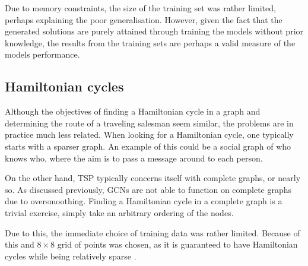 Due to memory constraints, the size of the training set was rather limited, perhaps explaining the poor generalisation.
However, given the fact that the generated solutions are purely attained through training the models without prior knowledge, the results from the training sets are perhaps a valid measure of the models performance.

\subsection{Hamiltonian cycles}
Although the objectives of finding a Hamiltonian cycle in a graph and determining the route of a traveling salesman seem similar, the problems are in practice much less related.
When looking for a Hamiltonian cycle, one typically starts with a sparser graph.
An example of this could be a social graph of who knows who, where the aim is to pass a message around to each person.

On the other hand, TSP typically concerns itself with complete graphs, or nearly so.
As discussed previously, GCNs are not able to function on complete graphs due to oversmoothing.
Finding a Hamiltonian cycle in a complete graph is a trivial exercise, simply take an arbitrary ordering of the nodes.

Due to this, the immediate choice of training data was rather limited.
Because of this and $8 \times 8$ grid of points was chosen, as it is guaranteed to have Hamiltonian cycles while being relatively sparse \cite{OEIS_hamilton}.
